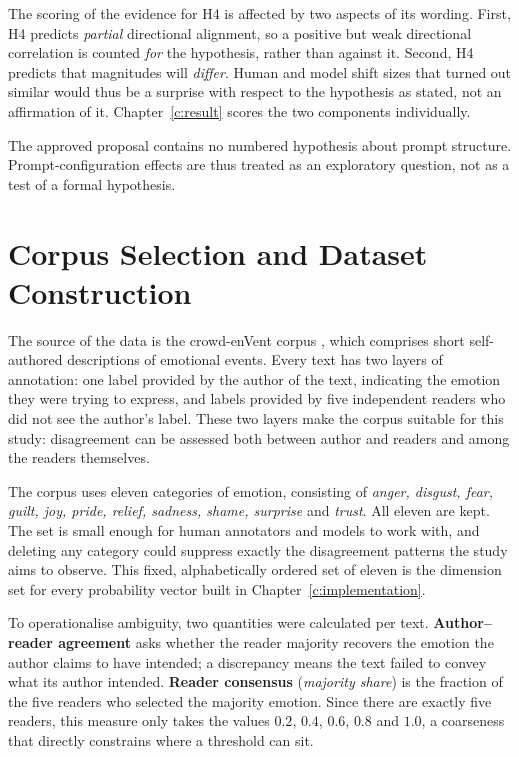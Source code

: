 \noindent
The scoring of the evidence for H4 is affected by two aspects of its wording. First, H4
predicts \emph{partial} directional alignment, so a positive but weak directional correlation is
counted \emph{for} the hypothesis, rather than against it. Second, H4 predicts that magnitudes
will \emph{differ}. Human and model shift sizes that turned out similar would thus be a surprise
with respect to the hypothesis as stated, not an affirmation of it. Chapter~\ref{c:result} scores
the two components individually.

The approved proposal contains no numbered hypothesis about prompt structure. Prompt-configuration
effects are thus treated as an exploratory question, not as a test of a formal hypothesis.

\section{Corpus Selection and Dataset Construction}
\label{meth:corpus}

\noindent
The source of the data is the crowd-enVent corpus \cite{Troiano2023CrowdEnVent}, which comprises
short self-authored descriptions of emotional events. Every text has two layers of annotation:
one label provided by the author of the text, indicating the emotion they were trying to express,
and labels provided by five independent readers who did not see the author's label. These two
layers make the corpus suitable for this study: disagreement can be assessed both between author
and readers and among the readers themselves.

The corpus uses eleven categories of emotion, consisting of \emph{anger, disgust, fear, guilt,
joy, pride, relief, sadness, shame, surprise} and \emph{trust}. All eleven are kept. The set is
small enough for human annotators and models to work with, and deleting any category could
suppress exactly the disagreement patterns the study aims to observe. This fixed, alphabetically
ordered set of eleven is the dimension set for every probability vector built in
Chapter~\ref{c:implementation}.

To operationalise ambiguity, two quantities were calculated per text. \textbf{Author--reader
agreement} asks whether the reader majority recovers the emotion the author claims to have
intended; a discrepancy means the text failed to convey what its author intended. \textbf{Reader
consensus} (\emph{majority share}) is the fraction of the five readers who selected the majority
emotion. Since there are exactly five readers, this measure only takes the values $0.2$, $0.4$,
$0.6$, $0.8$ and $1.0$, a coarseness that directly constrains where a threshold can sit.

